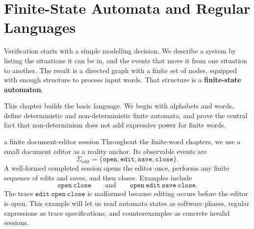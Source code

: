 
\chapter{Finite-State Automata and Regular Languages}
\label{ch:fsa}


Verification starts with a simple modelling decision.  We describe a
system by listing the situations it can be in, and the events that move
it from one situation to another.  The result is a directed graph with a
finite set of nodes, equipped with enough structure to process input
words.  That structure is a \textbf{finite-state automaton}.

This chapter builds the basic language.  We begin with alphabets and
words, define deterministic and non-deterministic finite automata, and
prove the central fact that non-determinism does not add expressive
power for finite words.



\begin{runningexample}{a finite document-editor session}
Throughout the finite-word chapters, we use a small document editor as a
reality anchor.  Its observable events are
\[
  \Sigma_{\mathrm{edit}}
  =\{\texttt{open},\texttt{edit},\texttt{save},\texttt{close}\}.
\]
A well-formed completed session opens the editor once, performs any finite
sequence of edits and saves, and then closes.  Examples include
\[
  \texttt{open}\ \texttt{close}
  \qquad\text{and}\qquad
  \texttt{open}\ \texttt{edit}\ \texttt{save}\ \texttt{close}.
\]
The trace \(\texttt{edit}\ \texttt{open}\ \texttt{close}\) is malformed
because editing occurs before the editor is open.  This example will let us
read automata states as software phases, regular expressions as trace
specifications, and counterexamples as concrete invalid sessions.
\end{runningexample}

